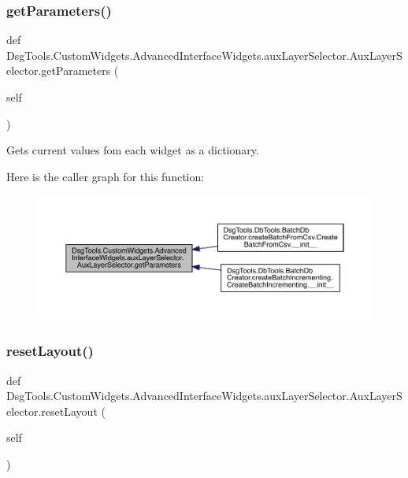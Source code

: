 \subsubsection{\texorpdfstring{get\+Parameters()}{getParameters()}}
{\footnotesize\ttfamily def Dsg\+Tools.\+Custom\+Widgets.\+Advanced\+Interface\+Widgets.\+aux\+Layer\+Selector.\+Aux\+Layer\+Selector.\+get\+Parameters (\begin{DoxyParamCaption}\item[{}]{self }\end{DoxyParamCaption})}

\begin{DoxyVerb}Gets current values fom each widget as a dictionary.
\end{DoxyVerb}
 Here is the caller graph for this function\+:
\nopagebreak
\begin{figure}[H]
\begin{center}
\leavevmode
\includegraphics[width=350pt]{class_dsg_tools_1_1_custom_widgets_1_1_advanced_interface_widgets_1_1aux_layer_selector_1_1_aux_layer_selector_a634291cda1f3c54dca193cc167531030_icgraph}
\end{center}
\end{figure}
\mbox{\label{class_dsg_tools_1_1_custom_widgets_1_1_advanced_interface_widgets_1_1aux_layer_selector_1_1_aux_layer_selector_ad498f4264a04c4392a37c0abc0422db4}} 
\subsubsection{\texorpdfstring{reset\+Layout()}{resetLayout()}}
{\footnotesize\ttfamily def Dsg\+Tools.\+Custom\+Widgets.\+Advanced\+Interface\+Widgets.\+aux\+Layer\+Selector.\+Aux\+Layer\+Selector.\+reset\+Layout (\begin{DoxyParamCaption}\item[{}]{self }\end{DoxyParamCaption})}

